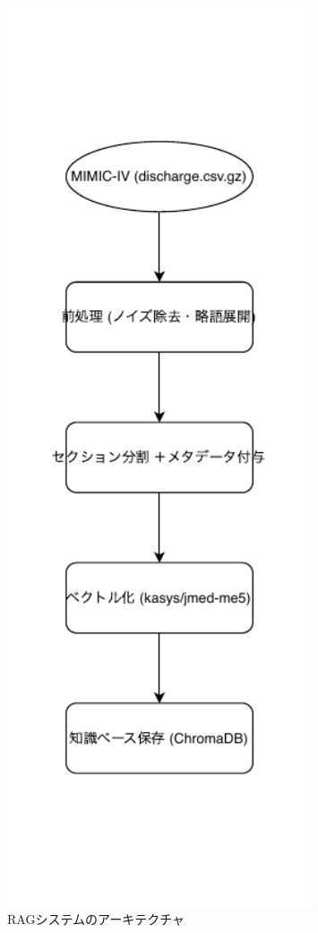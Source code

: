 \documentclass[12pt,a4paper]{jsarticle}
\begin{document}
\begin{figure}[H]
    \centering
    \includegraphics[width=0.8\textwidth]{RAG_Flowchart1.pdf}
    \caption{RAGシステムのアーキテクチャ}
    \label{fig:rag_system_architecture}
\end{figure}
\end{document}
